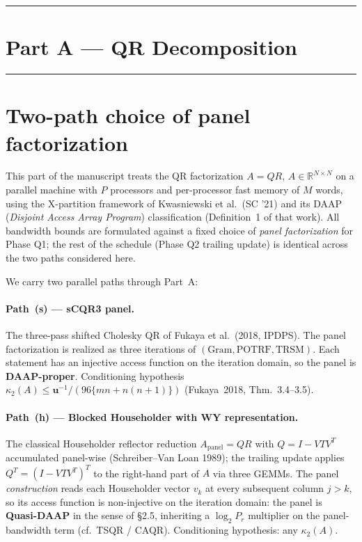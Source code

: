 \documentclass[11pt]{article}
\begin{document}
\newpage

\hrule
\section*{Part A --- QR Decomposition}
\hrule

\section{Two-path choice of panel factorization}
\label{sec:A0}

This part of the manuscript treats the QR factorization
$A = QR$, $A \in \mathbb{R}^{N \times N}$ on a parallel machine with
$P$ processors and per-processor fast memory of $M$ words, using the
X-partition framework of Kwasniewski et al.\ (SC '21) and its DAAP
(\emph{Disjoint Access Array Program}) classification (Definition~1
of that work). All bandwidth bounds are formulated against a fixed
choice of \emph{panel factorization} for Phase Q1; the rest of the
schedule (Phase Q2 trailing update) is identical across the two
paths considered here.

We carry two parallel paths through Part~A:

\paragraph{Path~(s) --- sCQR3 panel.}
The three-pass shifted Cholesky QR of Fukaya et al.\ (2018, IPDPS).
The panel factorization is realized as three iterations of
$(\text{Gram}, \text{POTRF}, \text{TRSM})$. Each statement has an
injective access function on the iteration domain, so the panel is
\textbf{DAAP-proper}. Conditioning hypothesis
$\kappa_2(A) \le \mathbf{u}^{-1}/(96\{mn+n(n{+}1)\})$
(Fukaya~2018, Thm.~3.4--3.5).

\paragraph{Path~(h) --- Blocked Householder with WY representation.}
The classical Householder reflector reduction $A_{\text{panel}} = QR$
with $Q = I - V T V^T$ accumulated panel-wise (Schreiber--Van Loan
1989); the trailing update applies $Q^T = (I - V T V^T)^T$ to the
right-hand part of $A$ via three GEMMs. The panel
\emph{construction} reads each Householder vector $v_k$ at every
subsequent column $j > k$, so its access function is non-injective on
the iteration domain: the panel is \textbf{Quasi-DAAP} in the sense
of \S2.5, inheriting a $\log_2 P_r$ multiplier on the panel-bandwidth
term (cf.\ TSQR / CAQR). Conditioning hypothesis: any $\kappa_2(A)$.
\end{document}
